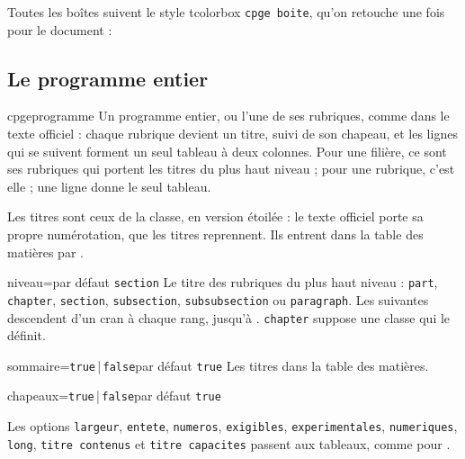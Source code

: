 \documentclass[a4paper,11pt]{article}
\newcommand\pkg[1]{\textsf{#1}}
\begin{document}
\begin{dispExample}
\end{dispExample}

\begin{dispExample}
\end{dispExample}

Toutes les boîtes suivent le style \pkg{tcolorbox} \texttt{cpge boite}, qu'on
retouche une fois pour le document :

\begin{dispListing}
\end{dispListing}

\subsection{Le programme entier}

\begin{docCommand}{cpgeprogramme}{}
  Un programme entier, ou l'une de ses rubriques, comme dans le texte
  officiel : chaque rubrique devient un titre, suivi de son chapeau, et les
  lignes qui se suivent forment un seul tableau à deux colonnes. Pour une
  filière, ce sont ses rubriques qui portent les titres du plus haut niveau ;
  pour une rubrique, c'est elle ; une ligne donne le seul tableau.

  Les titres sont ceux de la classe, en version étoilée : le texte officiel
  porte sa propre numérotation, que les titres reprennent. Ils entrent dans la
  table des matières par .
  \begin{docKey}{niveau}{=}{par défaut \texttt{section}}
    Le titre des rubriques du plus haut niveau : \texttt{part},
    \texttt{chapter}, \texttt{section}, \texttt{subsection},
    \texttt{subsubsection} ou \texttt{paragraph}. Les suivantes descendent
    d'un cran à chaque rang, jusqu'à . \texttt{chapter}
    suppose une classe qui le définit.
  \end{docKey}
  \begin{docKey}{sommaire}{=\texttt{true}\,|\,\texttt{false}}{par défaut \texttt{true}}
    Les titres dans la table des matières.
  \end{docKey}
  \begin{docKey}{chapeaux}{=\texttt{true}\,|\,\texttt{false}}{par défaut \texttt{true}}\end{docKey}
  Les options \texttt{largeur}, \texttt{entete}, \texttt{numeros},
  \texttt{exigibles}, \texttt{experimentales}, \texttt{numeriques},
  \texttt{long}, \texttt{titre contenus} et \texttt{titre capacites} passent aux tableaux,
  comme pour .
\end{docCommand}
\end{document}
